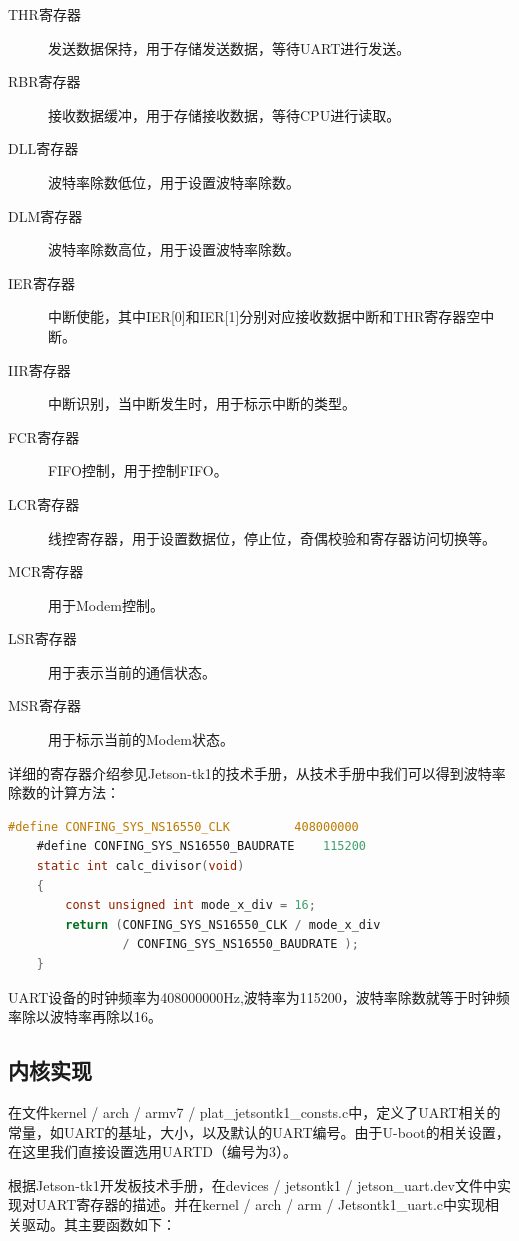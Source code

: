 \documentclass[a4paper, 12pt]{report}
\begin{document}
    \begin{description}
        \item[THR寄存器] 发送数据保持，用于存储发送数据，等待UART进行发送。
        \item[RBR寄存器] 接收数据缓冲，用于存储接收数据，等待CPU进行读取。
        \item[DLL寄存器] 波特率除数低位，用于设置波特率除数。
        \item[DLM寄存器] 波特率除数高位，用于设置波特率除数。
        \item[IER寄存器] 中断使能，其中IER[0]和IER[1]分别对应接收数据中断和THR寄存器空中断。
        \item[IIR寄存器] 中断识别，当中断发生时，用于标示中断的类型。
        \item[FCR寄存器] FIFO控制，用于控制FIFO。
        \item[LCR寄存器] 线控寄存器，用于设置数据位，停止位，奇偶校验和寄存器访问切换等。
        \item[MCR寄存器] 用于Modem控制。
        \item[LSR寄存器] 用于表示当前的通信状态。
        \item[MSR寄存器] 用于标示当前的Modem状态。
    \end{description}
    
    详细的寄存器介绍参见Jetson-tk1的技术手册，从技术手册中我们可以得到波特率除数的计算方法：
    \begin{lstlisting}[language=C]
    #define CONFING_SYS_NS16550_CLK         408000000
    #define CONFING_SYS_NS16550_BAUDRATE    115200
    static int calc_divisor(void)
    {
        const unsigned int mode_x_div = 16;
        return (CONFING_SYS_NS16550_CLK / mode_x_div
                / CONFING_SYS_NS16550_BAUDRATE );
    }
    \end{lstlisting}
    
    UART设备的时钟频率为408000000Hz,波特率为115200，波特率除数就等于时钟频率除以波特率再除以16。
    
    \subsection{内核实现}
    
    在文件kernel / arch / armv7 / plat\_jetsontk1\_consts.c中，定义了UART相关的常量，如UART的基址，大小，以及默认的UART编号。由于U-boot的相关设置，在这里我们直接设置选用UARTD（编号为3）。
    
    根据Jetson-tk1开发板技术手册，在devices / jetsontk1 / jetson\_uart.dev文件中实现对UART寄存器的描述。并在kernel / arch / arm / Jetsontk1\_uart.c中实现相关驱动。其主要函数如下：
    
\end{document}
